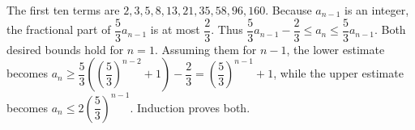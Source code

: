 The first ten terms are $2,3,5,8,13,21,35,58,96,160$. Because $a_{n-1}$ is an integer, the fractional part of $\dfrac{5}{3}a_{n-1}$ is at most $\dfrac{2}{3}$. Thus $\dfrac{5}{3}a_{n-1}-\dfrac{2}{3}\le a_n\le\dfrac{5}{3}a_{n-1}$. Both desired bounds hold for $n=1$. Assuming them for $n-1$, the lower estimate becomes $a_n\ge\dfrac{5}{3}\left((\dfrac{5}{3})^{n-2}+1\right)-\dfrac{2}{3}=(\dfrac{5}{3})^{n-1}+1$, while the upper estimate becomes $a_n\le2(\dfrac{5}{3})^{n-1}$. Induction proves both.
